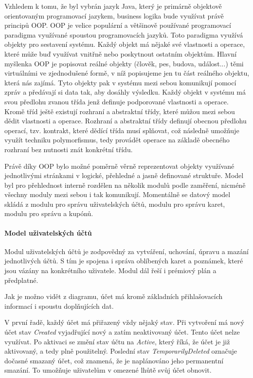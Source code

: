 		Vzhledem k tomu, že byl vybrán jazyk Java, který je primárně objektově orientovaným programovací jazykem, business
		logika bude využívat právě principů \ac{OOP}.
		\ac{OOP} je velice populární a většinově používané programovací paradigma využívané spoustou programovacích
		jazyků.
		Toto paradigma využívá objekty pro sestavení systému.
		Každý objekt má nějaké své vlastnosti a operace, které může buď využívat vnitřně nebo poskytnout ostatním
		objektům.
		Hlavní myšlenka \ac{OOP} je popisovat reálné objekty (člověk, pes, budova, událost...) těmi virtuálními ve zjednodušené
		formě, v níž popisujeme jen tu část reálného objektu, která nás zajímá.
		Tyto objekty pak v systému mezi sebou komunikují pomocí zpráv a předávají si data tak, aby dosáhly výsledku.
		Každý objekt v systému má svou předlohu zvanou třída jenž definuje podporované vlastnosti a operace.
		Kromě tříd ještě existují rozhraní a abstraktní třídy, které můžou mezi sebou dědit vlastnosti a operace.
		Rozhraní a abstraktní třídy definují obecnou předlohu operací, tzv. kontrakt, které dědící třída musí splňovat, což
		následně umožňuje využít techniku polymorfismus, tedy provádět operace na základě obecného rozhraní bez nutnosti
		znát konkrétní třídu.
		\cite{oop}

		Právě díky \ac{OOP} bylo možné poměrně věrně reprezentovat objekty využívané jednotlivými stránkami v logické,
		přehledné a jasně definované struktuře.
		Model byl pro přehlednost interně rozdělen na několik modulů podle zaměření, nicméně všechny moduly
		mezi sebou i tak komunikují.
		Momentálně se datový model skládá z modulu pro správu uživatelských účtů, modulu pro správu karet, modulu pro správu a
		kupónů.

		\paragraph{Model uživatelských účtů}

		Modul uživatelských účtů je zodpovědný za vytváření, uchování, úpravu a mazání jednotlivých účtů.
		S tím je spojena i správa oblíbených karet a poznámek, které jsou vázány na konkrétního uživatele.
		Modul dál řeší i prémiový plán a předplatné.


		Jak je možno vidět z diagramu, účet má kromě základních přihlašovacích informací i spoustu
		doplňujících dat.

		V první řadě, každý účet má přiřazený vždy nějaký stav.
		Při vytvoření má nový účet stav \emph{Created} vyjadřující nový a zatím neaktivovaný účet.
		Tento účet nelze využívat.
		Po aktivaci se změní stav účtu na \emph{Active}, který říká, že účet je již aktivovaný, a tedy plně použitelný.
		Poslední stav \emph{TemporarilyDeleted} označuje dočasné smazaný účet, což znamená, že je naplánováno jeho permanentní
		smazání.
		To umožňuje uživatelům v omezené lhůtě svůj účet obnovit.

